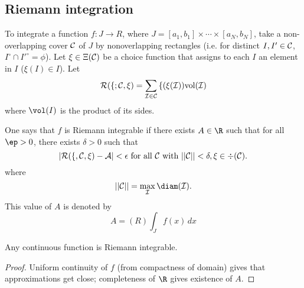 
\subsection{Riemann integration}

To integrate a function $f:J\to R$, where $J=[a_1,b_1]\times\cdots \times [a_N,b_N]$, take a non-overlapping cover $\cal{C}$ of $J$ by nonoverlapping rectangles (i.e. for distinct $I, I'\in \cal C$, $I^{\circ}\cap I'^{\circ}=\phi$). Let $\xi\in \Xi(\cal C)$ be a choice function that assigns to each $I$ an element in $I$ ($\xi(I)\in I$). Let
\[
\cal R(f;\cal C, \xi)=\sum_{I\in \cal C} f(\xi(I))\text{vol}(I)
\]
where $\vol(I)$ is the product of its sides.

One says that $f$ is Riemann integrable if there exists $A\in \R$ such that for all $\ep>0$, there exists $\delta>0$ such that 
\[
|\cal R(f, \cal C, \xi)-A|<\epsilon \text{ for all } \cal C\text{ with }||\cal C||<\delta, \xi\in \Xi(\cal C).
\]
where 
\[
||\cal C||=\max_I \diam(I).
\]
This value of $A$ is denoted by
\[
A=(R)\int_J f(x)\,dx
\]

\begin{thm}
Any continuous function is Riemann integrable.
\end{thm}
\begin{proof}
Uniform continuity of $f$ (from compactness of domain) gives that approximations get close; completeness of $\R$ gives existence of $A$.
\end{proof}

